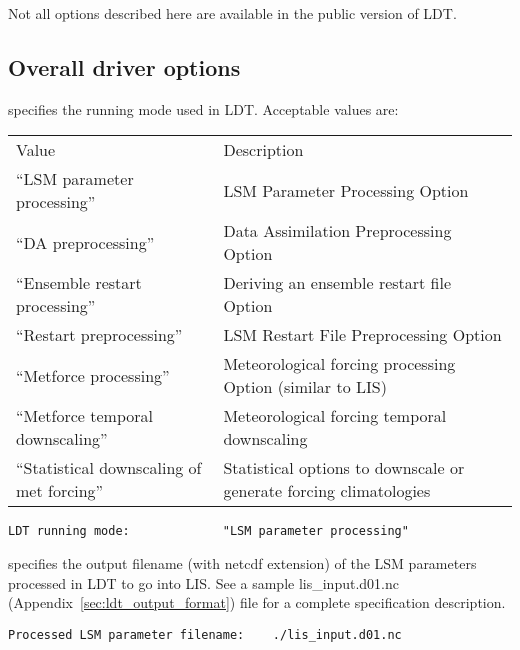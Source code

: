  Not all options described here are available in the public
 version of LDT.
 

 
 \subsection{Overall driver options} \label{ssec:driveropts}
 

 
  specifies the running mode used in LDT.
 Acceptable values are:

 \begin{tabular}{ll}
 Value & Description  \\
 ``LSM parameter processing''    & LSM Parameter Processing Option \\
 ``DA preprocessing''            & Data Assimilation Preprocessing
                                   Option \\
 ``Ensemble restart processing'' & Deriving an ensemble restart file
                                   Option \\
 ``Restart preprocessing''       & LSM Restart File Preprocessing
                                   Option \\
 ``Metforce processing''         & Meteorological forcing processing
                                   Option (similar to LIS) \\
 ``Metforce temporal downscaling'' & Meteorological forcing temporal
                                   downscaling \\
 ``Statistical downscaling of met forcing'' &  Statistical options to 
                                   downscale or generate forcing climatologies \\
 \end{tabular}
 

 \begin{Verbatim}[frame=single]
LDT running mode:             "LSM parameter processing"
 \end{Verbatim}

 
  specifies the output filename
 (with netcdf extension) of the
 LSM parameters processed in LDT to go into LIS.
 See a sample lis\_input.d01.nc (Appendix~\ref{sec:ldt_output_format})
 file for a complete specification description.
 

 \begin{Verbatim}[frame=single]
Processed LSM parameter filename:    ./lis_input.d01.nc
 \end{Verbatim}

